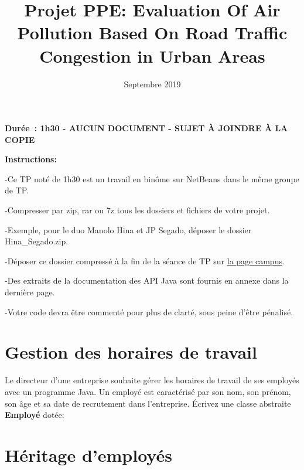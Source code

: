 \documentclass[a4paper]{article}
\title{\textbf{Projet PPE:} Evaluation Of Air Pollution Based On  Road Traffic Congestion in Urban Areas}
\date{Septembre 2019}
\begin{document}
\maketitle

\begin{center}
\textbf{Durée : 1h30 - AUCUN DOCUMENT - SUJET À JOINDRE À LA COPIE}
\end{center}
\bigskip

\textbf{Instructions:}

-Ce TP noté de 1h30 est un travail en binôme sur NetBeans dans le même groupe de TP.

-Compresser par zip, rar ou 7z tous les dossiers et fichiers de votre projet.

-Exemple, pour le duo Manolo Hina et JP Segado, déposer le dossier Hina\_Segado.zip.

-Déposer ce dossier compressé à la fin de la séance de TP sur \href{https://pedago-ece.campusonline.me/course/view.php?id=124}{la page campus}.

-Des extraits de la documentation des API Java sont fournis en annexe dans la dernière page.

-Votre code devra être commenté pour plus de clarté,
	sous peine d’être pénalisé.



\section{Gestion des horaires de travail}
Le directeur d’une entreprise souhaite gérer les horaires de travail de ses employés avec un programme Java.
Un employé est caractérisé par son nom,
	son prénom,
	son âge et sa date de recrutement dans l’entreprise.
Écrivez une classe abstraite \textbf{Employé} dotée:

\section{Héritage d’employés}
\end{document}
